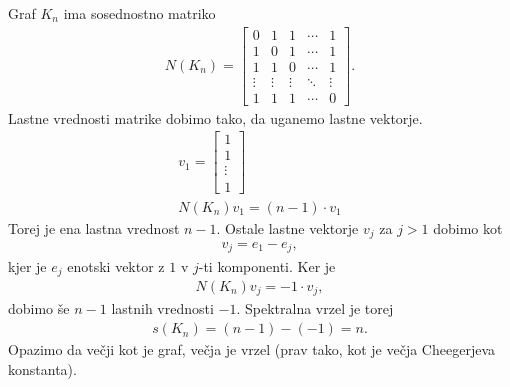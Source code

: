 \begin{primer}
    Graf \(K_n\) ima sosednostno matriko
    \begin{align*}
        N(K_n) = \begin{bmatrix}
                     0      & 1      & 1      & \cdots & 1      \\
                     1      & 0      & 1      & \cdots & 1      \\
                     1      & 1      & 0      & \cdots & 1      \\
                     \vdots & \vdots & \vdots & \ddots & \vdots \\
                     1      & 1      & 1      & \cdots & 0
                 \end{bmatrix}.
    \end{align*}
    Lastne vrednosti matrike dobimo tako, da uganemo lastne vektorje.
    \begin{align*}
        v_1 = \begin{bmatrix}
                  1      \\
                  1      \\
                  \vdots \\
                  1
              \end{bmatrix} \\
        N(K_n) v_1 = (n-1) \cdot v_1
    \end{align*}
    Torej je ena lastna vrednost \(n-1\). Ostale lastne vektorje \(v_j\) za \(j>1\) dobimo kot
    \begin{align*}
        v_j = e_1 - e_j,
    \end{align*}
    kjer je \(e_j\) enotski vektor z \(1\) v \(j\)-ti komponenti. Ker je
    \begin{align*}
        N(K_n)v_j = -1 \cdot v_j,
    \end{align*}
    dobimo še \(n-1\) lastnih vrednosti \(-1\). Spektralna vrzel je torej
    \begin{align*}
        s(K_n) = (n-1) - (-1) = n.
    \end{align*}
    Opazimo da večji kot je graf, večja je vrzel (prav tako, kot je večja Cheegerjeva konstanta).
\end{primer}
